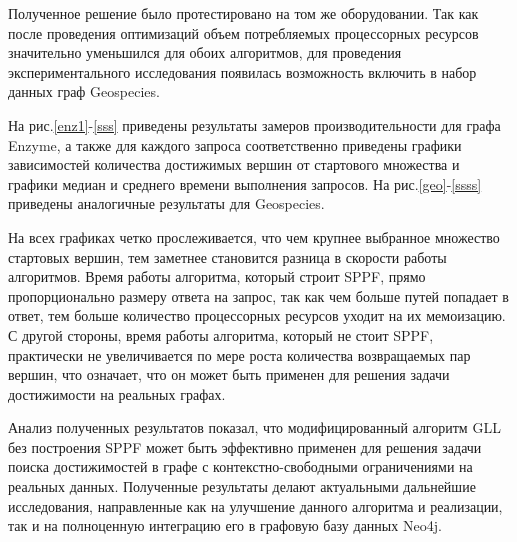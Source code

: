 \documentclass[14pt]{matmex-diploma-custom}
\theoremstyle{definition}
\begin{document}
Полученное решение было протестировано на том же оборудовании. Так как после проведения оптимизаций объем потребляемых процессорных ресурсов значительно уменьшился для обоих алгоритмов, для проведения экспериментального исследования появилась возможность включить в набор данных граф Geospecies.

На рис.\ref{enz1}-\ref{sss} приведены результаты замеров производительности для графа Enzyme, а также для каждого запроса соответственно приведены графики зависимостей количества достижимых вершин от стартового множества и графики медиан и среднего времени выполнения запросов.
На рис.\ref{geo}-\ref{ssss} приведены аналогичные результаты для Geospecies.

На всех графиках четко прослеживается, что чем крупнее выбранное множество стартовых вершин, тем заметнее становится разница в скорости работы алгоритмов. Время работы алгоритма, который строит SPPF, прямо пропорционально размеру ответа на запрос, так как чем больше путей попадает в ответ, тем больше количество процессорных ресурсов уходит на их мемоизацию. С другой стороны, время работы алгоритма, который не стоит SPPF, практически не увеличивается по мере роста количества возвращаемых пар вершин, что означает, что он может быть применен для решения задачи достижимости на реальных графах.

Анализ полученных результатов показал, что модифицированный алгоритм GLL без построения SPPF может быть эффективно применен для решения задачи поиска достижимостей в графе с контекстно-свободными ограничениями на реальных данных.
Полученные результаты делают актуальными дальнейшие исследования, направленные как на улучшение данного алгоритма и реализации, так и на полноценную интеграцию его в графовую базу данных Neo4j.
\end{document}
